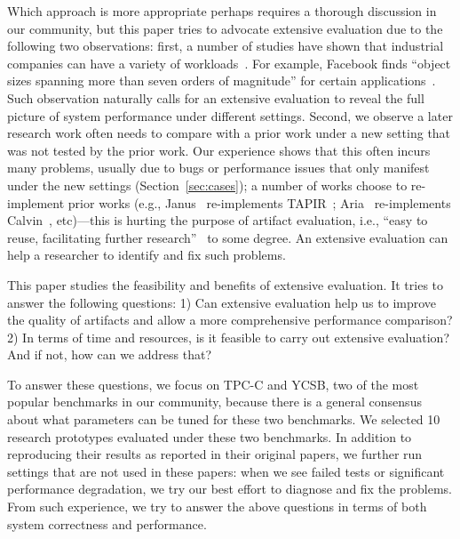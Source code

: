 Which approach is more appropriate perhaps requires a thorough discussion
in our community, but this paper tries to advocate extensive evaluation
due to the following two observations:
first, a number of studies have shown that industrial companies
can have a variety of workloads~\cite{Atikoglu2012WAL,Yang2020Twitter,Nishtala2013Scaling,Berg2020CacheLib}.
For example, Facebook finds ``object sizes spanning
more than seven orders of magnitude'' for certain applications~\cite{Berg2020CacheLib}.
Such observation naturally calls for
an extensive evaluation to reveal the full picture of system performance under different settings.
Second, we observe a later research work often needs to compare with a prior work under a
new setting that was not tested by the prior work. Our experience shows
that this often incurs many problems, usually due to bugs or performance
issues that only manifest under the new settings (Section~\ref{sec:cases}); a number of works choose
to re-implement prior works (e.g., Janus~\cite{Mu2016Consolidating} re-implements TAPIR~\cite{Zhang15Building}; Aria~\cite{Lu2020Aria} re-implements
Calvin~\cite{Thomson2012Calvin}, etc)---this is hurting the purpose of artifact evaluation, i.e., ``easy to reuse, facilitating further research''~\cite{osdi-repro} to
some degree. An extensive evaluation can help a researcher
to identify and fix such problems.


This paper studies the feasibility and benefits of extensive evaluation.
It tries to answer the following questions: 1)  Can extensive evaluation help us to improve the quality of artifacts
and allow a more comprehensive performance comparison?
2) In terms of time and resources, is it feasible
to carry out extensive evaluation? And if not, how can we address that?


To answer these questions, we focus on TPC-C and YCSB, two of the most popular
benchmarks in our community, because there is a general consensus about what
parameters can be tuned for these two benchmarks.
We selected 10 research prototypes evaluated
under these two benchmarks. In addition to reproducing their results as
reported in their original papers, we further run settings that are not used
in these papers: when we see failed tests or significant performance degradation,
we try our best effort to diagnose and fix the problems. From such experience,
we try to answer the above questions in terms of both system correctness and
performance.

